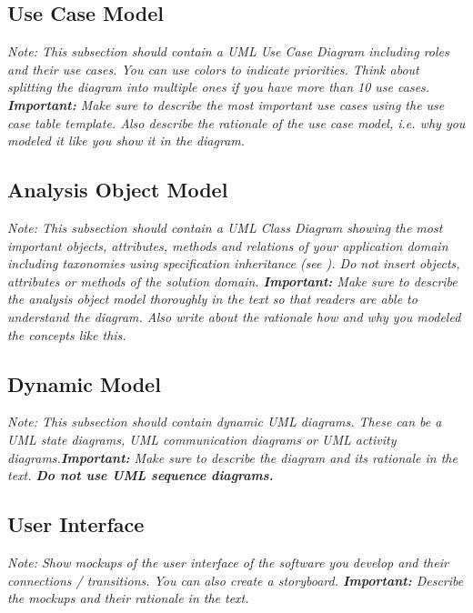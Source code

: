 \documentclass[a4paper,12pt,twoside]{report}
\begin{document}
\subsection{Use Case Model}

\textit{Note: This subsection should contain a UML Use Case Diagram including roles and their use cases. You can use colors to indicate priorities. Think about splitting the diagram into multiple ones if you have more than 10 use cases.
\textbf{Important:} Make sure to describe the most important use cases using the use case table template. Also describe the rationale of the use case model, i.e. why you modeled it like you show it in the diagram.}

\subsection{Analysis Object Model}

\textit{Note: This subsection should contain a UML Class Diagram showing the most important objects, attributes, methods and relations of your application domain including taxonomies using specification inheritance (see \cite{bruegge2004object}). Do not insert objects, attributes or methods of the solution domain.
\textbf{Important:} Make sure to describe the analysis object model thoroughly in the text so that readers are able to understand the diagram. Also write about the rationale how and why you modeled the concepts like this.}

\subsection{Dynamic Model}

\textit{Note: This subsection should contain dynamic UML diagrams. These can be a UML state diagrams, UML communication diagrams or UML activity diagrams.\textbf{Important:} Make sure to describe the diagram and its rationale in the text. \textbf{Do not use UML sequence diagrams.}}

\subsection{User Interface}

\textit{Note: Show mockups of the user interface of the software you develop and their connections / transitions. You can also create a storyboard. \textbf{Important:} Describe the mockups and their rationale in the text.}
\end{document}
